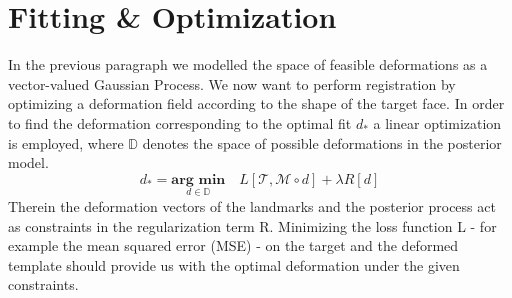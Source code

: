 \section{Fitting \& Optimization}
\label{optimization}
In the previous paragraph we modelled the space of feasible deformations as a vector-valued Gaussian Process. We now want to perform registration by optimizing a deformation field according to the shape of the target face. 
In order to find the deformation corresponding to the optimal fit $d_{*}$ a linear optimization is employed, where $\mathbb{D}$ denotes the space of possible deformations in the posterior model.
\begin{equation}
    d_{*} = \underset{d \in \mathbb{D}}{\textbf{arg min}}\quad L[\mathcal{T}, \mathcal{M }\circ d]+\lambda R[d]
\end{equation}
Therein the deformation vectors of the landmarks and the posterior process act as constraints in the regularization term R. Minimizing the loss function L - for example the mean squared error (MSE) - on the target and the deformed template should provide us with the optimal deformation under the given constraints.\\ 

